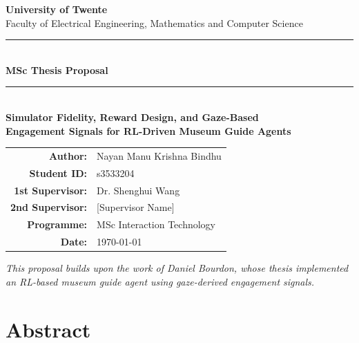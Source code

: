 \documentclass[a4paper, 11pt]{article}
\begin{document}
\begin{titlepage}
  \centering
  \vspace*{1cm}


  {\Large\bfseries University of Twente}\\[0.3cm]
  {\large Faculty of Electrical Engineering, Mathematics and Computer Science}\\[0.3cm]

  \rule{\textwidth}{1.5pt}\\[0.5cm]
  {\LARGE\bfseries MSc Thesis Proposal}\\[0.3cm]
  \rule{\textwidth}{1.5pt}\\[1.5cm]

  {\Large\bfseries Simulator Fidelity, Reward Design, and Gaze-Based\\
  Engagement Signals for RL-Driven Museum Guide Agents}\\[2cm]

  \begin{tabular}{rl}
    \textbf{Author:}      & Nayan Manu Krishna Bindhu \\
    \textbf{Student ID:}   & s3533204 \\[0.5cm]
    \textbf{1st Supervisor:} & Dr. Shenghui Wang \\
    \textbf{2nd Supervisor:} & [Supervisor Name] \\
    \textbf{Programme:}    & MSc Interaction Technology \\
    \textbf{Date:}         & \today \\
  \end{tabular}

  \vfill

  {\small\itshape This proposal builds upon the work of Daniel Bourdon,
  whose thesis implemented an RL-based museum guide agent using gaze-derived
  engagement signals.}
\end{titlepage}

\newpage
\section*{Abstract}
\end{document}
